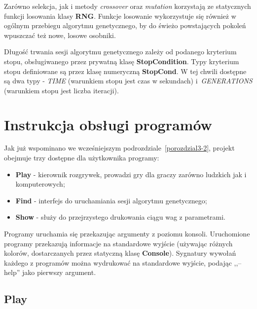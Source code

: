 Zarówno selekcja, jak i metody \textit{crossover} oraz \textit{mutation} korzystają ze statycznych funkcji losowania klasy \textbf{RNG}. Funkcje losowanie wykorzystuje się również w ogólnym przebiegu algorytmu genetycznego, by do świeżo powstających pokoleń wpuszczać też nowe, losowe osobniki.

Długość trwania sesji algorytmu genetycznego zależy od podanego kryterium stopu, obsługiwanego przez prywatną klasę \textbf{StopCondition}. Typy kryterium stopu definiowane są przez klasę numeryczną \textbf{StopCond}. W tej chwili dostępne są dwa typy - \textit{TIME} (warunkiem stopu jest czas w sekundach) i~\textit{GENERATIONS} (warunkiem stopu jest liczba iteracji).

% 


\section{Instrukcja obsługi programów}

Jak już wspominano we wcześniejszym podrozdziale~\ref{porozdzial3-2}, projekt obejmuje trzy dostępne dla użytkownika programy:
\begin{itemize}
    \item \textbf{Play} - kierownik rozgrywek, prowadzi gry dla graczy zarówno ludzkich jak i komputerowych;
    \item \textbf{Find} - interfejs do uruchamiania sesji algorytmu genetycznego;
    \item \textbf{Show} - służy do przejrzystego drukowania ciągu wag z parametrami.
\end{itemize}

Programy uruchamia się przekazując argumenty z poziomu konsoli. Uruchomione programy przekazują informacje na standardowe wyjście (używając różnych kolorów, dostarczanych przez statyczną klasę \textbf{Console}). Sygnatury wywołań każdego z programów można wydrukować na standardowe wyjście, podając ,,--help'' jako pierwszy argument.

\subsection{Play}

